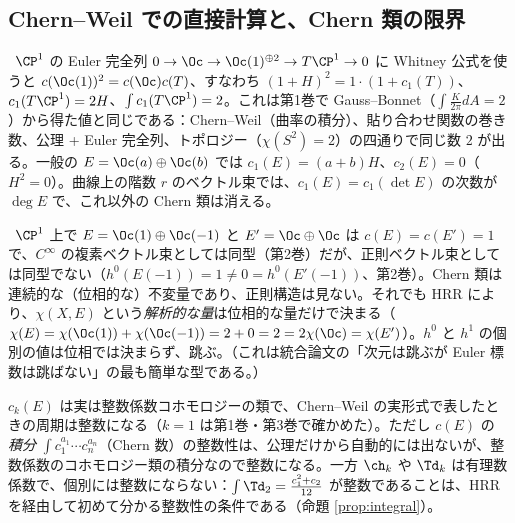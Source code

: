 \subsection{Chern--Weil での直接計算と、Chern 類の限界}
\begin{ex}[$\CP^1$ での整合]\label{ex:P1check}\tP\
$\CP^1$ の Euler 完全列 $0\to\Oc\to\Oc(1)^{\oplus2}\to T\CP^1\to0$ に Whitney 公式を使うと $c(\Oc(1))^2=c(\Oc)c(T)$、すなわち $(1+H)^2=1\cdot(1+c_1(T))$、$c_1(T\CP^1)=2H$、$\int c_1(T\CP^1)=2$。これは第1巻で Gauss--Bonnet（$\int\frac K{2\pi}dA=2$）から得た値と同じである：Chern--Weil（曲率の積分）、貼り合わせ関数の巻き数、公理 + Euler 完全列、トポロジー（$\chi(S^2)=2$）の四通りで同じ数 $2$ が出る。一般の $E=\Oc(a)\oplus\Oc(b)$ では $c_1(E)=(a+b)H$、$c_2(E)=0$（$H^2=0$）。曲線上の階数 $r$ のベクトル束では、$c_1(E)=c_1(\det E)$ の次数が $\deg E$ で、これ以外の Chern 類は消える。
\end{ex}
\begin{ex}[Chern 類は正則同型類を決めない]\label{ex:notdetermine}\tP\
$\CP^1$ 上で $E=\Oc(1)\oplus\Oc(-1)$ と $E'=\Oc\oplus\Oc$ は $c(E)=c(E')=1$ で、$C^\infty$ の複素ベクトル束としては同型（第2巻）だが、正則ベクトル束としては同型でない（$h^0(E(-1))=1\neq0=h^0(E'(-1))$、第2巻）。Chern 類は連続的な（位相的な）不変量であり、正則構造は見ない。それでも HRR により、$\chi(X,E)$ という\emph{解析的な量}は位相的な量だけで決まる（$\chi(E)=\chi(\Oc(1))+\chi(\Oc(-1))=2+0=2=2\chi(\Oc)=\chi(E')$）。$h^0$ と $h^1$ の個別の値は位相では決まらず、跳ぶ。（これは統合論文の「次元は跳ぶが Euler 標数は跳ばない」の最も簡単な型である。）
\end{ex}
\begin{rem}
$c_k(E)$ は実は整数係数コホモロジーの類で、Chern--Weil の実形式で表したときの周期は整数になる（$k=1$ は第1巻・第3巻で確かめた）。ただし $c(E)$ の \emph{積分} $\int c_1^{a_1}\cdots c_n^{a_n}$（Chern 数）の整数性は、公理だけから自動的には出ないが、整数係数のコホモロジー類の積分なので整数になる。一方 $\ch_k$ や $\Td_k$ は有理数係数で、個別には整数にならない：$\int\Td_2=\frac{c_1^2+c_2}{12}$ が整数であることは、HRR を経由して初めて分かる整数性の条件である（命題 \ref{prop:integral}）。
\end{rem}


